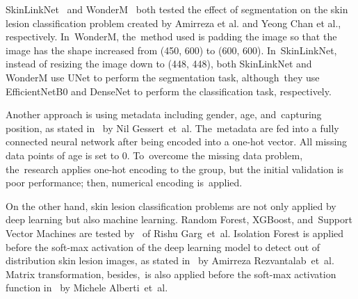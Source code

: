 \documentclass[sensors,article,accept,pdftex,moreauthors]{Definitions/mdpi}
\begin{document}
SkinLinkNet~\cite{12602} and WonderM~\cite{03426} both tested the effect of segmentation on the skin lesion classification problem created by Amirreza et al. and Yeong Chan et al., respectively. In~WonderM, the~method used is padding the image so that the image has the shape increased from (450, 600) to (600, 600). In~SkinLinkNet, instead of resizing the image down to (448, 448), both SkinLinkNet and WonderM use UNet to perform the segmentation task, although~they use EfficientNetB0 and DenseNet to perform the classification task, respectively. 

Another approach is using metadata including gender, age, and~capturing position, as stated in~\cite{03910} by Nil Gessert~et~al. The~metadata are fed into a fully connected neural network after being encoded into a one-hot vector. All missing data points of age is set to 0. To~overcome the missing data problem, the~research applies one-hot encoding to the group, but the initial validation is poor performance; then, numerical encoding is~applied.

On the other hand, skin lesion classification problems are not only applied by deep learning but also machine learning. Random Forest, XGBoost, and~Support Vector Machines are tested by~\cite{03798} of Rishu Garg~et~al. Isolation Forest is applied before the soft-max activation of the deep learning model to detect out of distribution skin lesion images, as stated in~\cite{10348} by Amirreza Rezvantalab~et~al. Matrix transformation, besides,~is also applied before the soft-max activation function in~\cite{05045} by Michele Alberti~et~al. 
\end{document}
